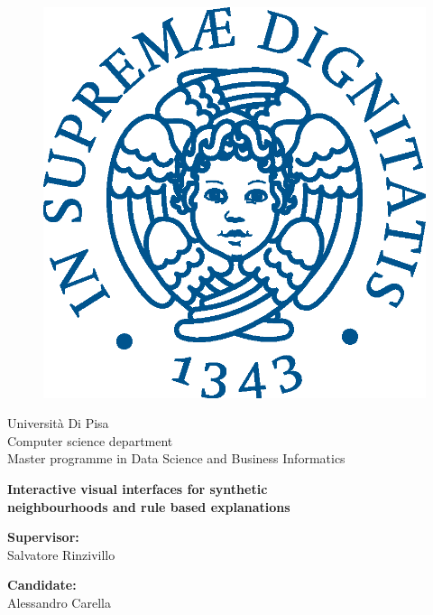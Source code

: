\begin{titlepage}
\begin{figure}[!htb]
    \centering
    \includegraphics[keepaspectratio=true,scale=0.65]{images/cherubinFrontespizio.eps}
\end{figure}

\begin{center}
    \vspace{10mm}
    \LARGE{Università Di Pisa}
    \vspace{5mm}
    \\ \large{Computer science department}
    \vspace{10mm}
    \\ \LARGE{Master programme in Data Science and Business Informatics}
\end{center}

\vspace{10mm}
\begin{center}
    {\LARGE{\bf Interactive visual interfaces for synthetic\\ \vspace{5mm}neighbourhoods and rule based explanations}}
\end{center}
\vspace{20mm}

\noindent
\begin{minipage}[t]{0.47\textwidth}
    \large \textbf{Supervisor:} \\
    \large Salvatore Rinzivillo \\
    \vspace{3mm}
\end{minipage}
\hfill
\begin{minipage}[t]{0.47\textwidth}
    \raggedleft
    \large \textbf{Candidate:} \\
    \large Alessandro Carella \\
    \vspace{3mm}
\end{minipage}



\end{titlepage}
